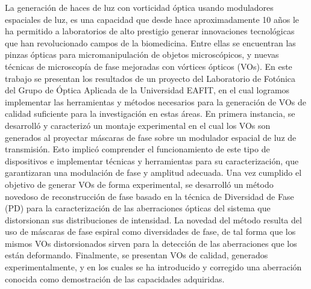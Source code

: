 




\begin{resumen}        %

La generación de haces de luz con vorticidad óptica usando moduladores
espaciales de luz, es una capacidad que desde hace 
aproximadamente 10 años le ha
permitido a laboratorios de alto prestigio generar
innovaciones tecnológicas que han revolucionado campos de la
biomedicina. Entre ellas se encuentran las pinzas
ópticas para micromanipulación de objetos microscópicos, y nuevas
técnicas de microscopía de fase mejoradas con vórtices ópticos (VOs).  
En este trabajo se presentan los resultados de un proyecto del Laboratorio de Fotónica del Grupo de Óptica Aplicada de
la Universidad EAFIT, en el cual logramos implementar las herramientas y métodos
necesarios para la generación de VOs de calidad suficiente para la
investigación en estas áreas. 
En primera instancia, se desarrolló y caracterizó un montaje experimental
en el cual los VOs son generados al proyectar máscaras de
fase sobre un modulador espacial de luz de transmisión. Esto implicó
comprender el funcionamiento de este tipo de dispositivos e
implementar técnicas y herramientas para su caracterización, que garantizaran una
modulación de fase y amplitud adecuada. Una vez cumplido el objetivo de generar VOs
de forma experimental, se desarrolló un método novedoso de reconstrucción de fase basado en
la técnica de Diversidad de Fase (PD) para la caracterización de las
aberraciones ópticas del sistema que distorsionan sus distribuciones de intensidad. La
novedad del método resulta del uso de máscaras de fase espiral como
diversidades de fase, de tal forma que los mismos VOs distorsionados sirven
para la detección de las aberraciones que los están deformando. 
Finalmente, se presentan VOs de calidad, generados experimentalmente, y en los cuales
se ha introducido y corregido una aberración conocida como
demostración de las capacidades adquiridas.
\end{resumen}





